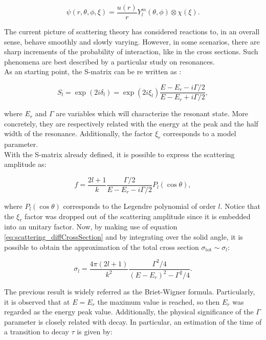 \documentclass[openany]{book}
\begin{document}
\begin{equation} \label{eq:scattering_waveFunction}
	\psi(r, \theta, \phi, \xi) = \frac{u(r)}{r} Y_{l}^{m}(\theta, \phi) \otimes \chi(\xi).
\end{equation}

The current picture of scattering theory has considered reactions to, in an overall sense, behave smoothly and slowly varying. However, in some scenarios, there are sharp increments of the probability of interaction, like in the cross sections. Such phenomena are best described by a particular study on resonances. \\

As an starting point, the S-matrix can be re written as \cite{joachain_1983}: 

\begin{equation} \label{eq:scattering_resonant_Smatrix}
	S_l = \exp{(2i\delta_l)} = \exp(2i\xi_l) \frac{E - E_r - i\Gamma/2 }{E - E_r + i\Gamma/2 },
\end{equation}

where $E_r$ and $\Gamma$ are variables which will characterize the resonant state. More concretely, they are respectively related with the energy at the peak and the half width of the resonance. Additionally, the factor $\xi_r$ corresponds to a model parameter.  \\ 

With the S-matrix already defined, it is possible to express the scattering amplitude as: 

\begin{equation} \label{eq:scattering_resonant_scatteringAmplitude}
	f =  \frac{2l + 1}{k} \frac{\Gamma/2}{E - E_r - i\Gamma/2}P_l(\cos \theta),
\end{equation}

where $P_l(\cos \theta)$ corresponds to the Legendre polynomial of order $l$. Notice that the $\xi_r$ factor was dropped out of the scattering amplitude since it is embedded into an unitary factor.   Now, by making use of equation \ref{eq:scattering_diffCrossSection} and by integrating over the solid angle, it is possible to obtain the approximation of the total cross section $\sigma_{\mathrm{tot}} \sim \sigma_l$: 

\begin{equation} \label{eq:scattering_resonant_breitWigner}
	\sigma_l =  \frac{4\pi(2l + 1)}{k^2} \frac{\Gamma^2/4}{(E - E_r)^2 - \Gamma^2/4}.
\end{equation}

The previous result is widely referred as the Briet-Wigner formula. Particularly, it is observed that at $E = E_r$ the maximum value is reached, so then $E_r$ was regarded as the energy peak value. Additionally, the physical significance of the $\Gamma$ parameter is closely related with decay. In particular, an estimation of the time of a transition to decay $\tau$ is given by: 
\end{document}
